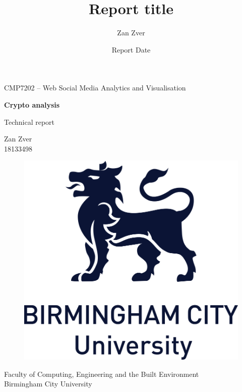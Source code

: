 \documentclass[12pt,a4paper]{article}
\title{Report title}
\author{Zan Zver}
\date{Report Date }
\newcommand{\authorName}{Zan Zver}
\newcommand{\authorID}{18133498}
\newcommand{\reportTitle}{Crypto analysis}
\begin{document}
\begin{titlepage}
   \begin{center}
       CMP7202 – Web Social Media Analytics and Visualisation
       \vspace*{0.5cm}

       \huge\textbf{\reportTitle} 

       \vspace{0.5cm}
        Technical report
            
       \vspace{1.5cm}

       \authorName \\
       \authorID


       \vfill
            
       \vspace{0.8cm}
     
       \begin{figure}[htp]
        \centering
        \includegraphics[scale=0.6]{logo}
        \end{figure}
            
       \large{Faculty of Computing, Engineering and the Built Environment \\
       Birmingham City University \\}
            
   \end{center}
\end{titlepage}
\pagestyle{fancy}
\fancyhf{}
\setlength{\headsep}{50pt}
\end{document}
